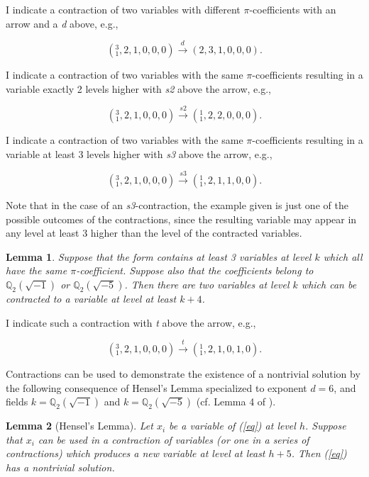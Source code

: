 \documentclass[draft]{publmathdeb}
\newtheorem{lemma}{Lemma}
\begin{document}
I indicate a contraction of two variables with different $\pi$-coefficients with an arrow and a \textit{d} above, e.g.,

$$(^3_1, 2, 1, 0, 0, 0) \xrightarrow{d} (2, 3, 1, 0, 0, 0).$$

I indicate a contraction of two variables with the same $\pi$-coefficients resulting in a variable exactly 2 levels higher with \textit{s2} above the arrow, e.g.,

$$(^3_1, 2, 1, 0, 0, 0) \xrightarrow{s2} (^1_1, 2, 2, 0, 0, 0).$$

I indicate a contraction of two variables with the same $\pi$-coefficients resulting in a variable at least 3 levels higher with \textit{s3} above the arrow, e.g.,

$$(^3_1, 2, 1, 0, 0, 0) \xrightarrow{s3} (^1_1, 2, 1, 1, 0, 0).$$

Note that in the case of an \textit{s3}-contraction, the example given is just one of the possible outcomes of the contractions, since the resulting variable may appear in any level at least 3 higher than the level of the contracted variables.

\begin{lemma}
\label{three}
Suppose that the form contains at least 3 variables at level $k$ which all have the same $\pi$-coefficient.  Suppose also that the coefficients belong to $\mathbb{Q}_2(\sqrt{-1})$ or $\mathbb{Q}_2(\sqrt{-5})$.  Then there are two variables at level $k$ which can be contracted to a variable at level at least $k + 4$.
\end{lemma}

I indicate such a contraction with \textit{t} above the arrow, e.g.,

$$(^3_1, 2, 1, 0, 0, 0) \xrightarrow{t} (^1_1, 2, 1, 0, 1, 0).$$

Contractions can be used to demonstrate the existence of a nontrivial solution by the following consequence of Hensel's Lemma specialized to exponent $d=6$, and fields $k=\mathbb{Q}_2(\sqrt{-1})$ and $k=\mathbb{Q}_2(\sqrt{-5})$ (cf. Lemma 4 of \cite{knapp2016solubility}).

\begin{lemma}[Hensel's Lemma]
Let $x_i$ be a variable of (\ref{eq}) at level $h$.  Suppose that $x_i$ can be used in a contraction of variables (or one in a series of contractions) which produces a new variable at level at least $h+5$.  Then (\ref{eq}) has a nontrivial solution.
\end{lemma}
\end{document}
